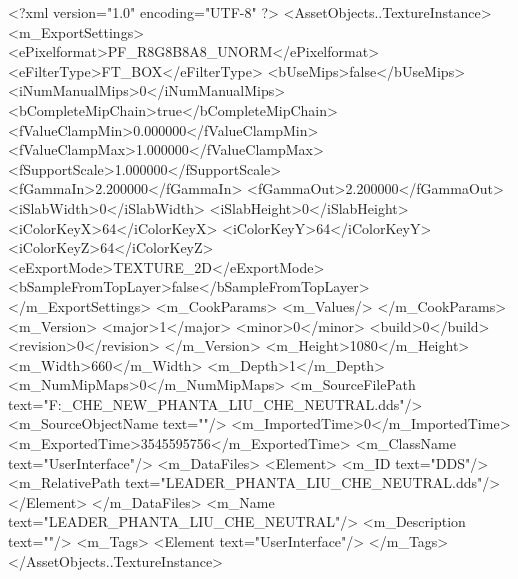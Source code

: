 <?xml version="1.0" encoding="UTF-8" ?>
<AssetObjects..TextureInstance>
	<m_ExportSettings>
		<ePixelformat>PF_R8G8B8A8_UNORM</ePixelformat>
		<eFilterType>FT_BOX</eFilterType>
		<bUseMips>false</bUseMips>
		<iNumManualMips>0</iNumManualMips>
		<bCompleteMipChain>true</bCompleteMipChain>
		<fValueClampMin>0.000000</fValueClampMin>
		<fValueClampMax>1.000000</fValueClampMax>
		<fSupportScale>1.000000</fSupportScale>
		<fGammaIn>2.200000</fGammaIn>
		<fGammaOut>2.200000</fGammaOut>
		<iSlabWidth>0</iSlabWidth>
		<iSlabHeight>0</iSlabHeight>
		<iColorKeyX>64</iColorKeyX>
		<iColorKeyY>64</iColorKeyY>
		<iColorKeyZ>64</iColorKeyZ>
		<eExportMode>TEXTURE_2D</eExportMode>
		<bSampleFromTopLayer>false</bSampleFromTopLayer>
	</m_ExportSettings>
	<m_CookParams>
		<m_Values/>
	</m_CookParams>
	<m_Version>
		<major>1</major>
		<minor>0</minor>
		<build>0</build>
		<revision>0</revision>
	</m_Version>
	<m_Height>1080</m_Height>
	<m_Width>660</m_Width>
	<m_Depth>1</m_Depth>
	<m_NumMipMaps>0</m_NumMipMaps>
	<m_SourceFilePath text="F:\MOD\TEMPLATE\LIU_CHE_NEW\LEADER_PHANTA_LIU_CHE_NEUTRAL.dds"/>
	<m_SourceObjectName text=""/>
	<m_ImportedTime>0</m_ImportedTime>
	<m_ExportedTime>3545595756</m_ExportedTime>
	<m_ClassName text="UserInterface"/>
	<m_DataFiles>
		<Element>
			<m_ID text="DDS"/>
			<m_RelativePath text="LEADER_PHANTA_LIU_CHE_NEUTRAL.dds"/>
		</Element>
	</m_DataFiles>
	<m_Name text="LEADER_PHANTA_LIU_CHE_NEUTRAL"/>
	<m_Description text=""/>
	<m_Tags>
		<Element text="UserInterface"/>
	</m_Tags>
</AssetObjects..TextureInstance>

